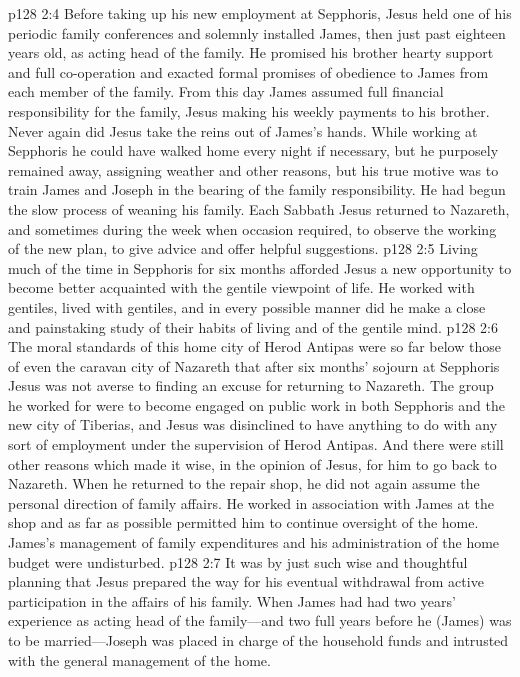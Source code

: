 \pc \vs p128 2:4 Before taking up his new employment at Sepphoris, Jesus held one of his periodic family conferences and solemnly installed James, then just past eighteen years old, as acting head of the family. He promised his brother hearty support and full co\hyp{}operation and exacted formal promises of obedience to James from each member of the family. From this day James assumed full financial responsibility for the family, Jesus making his weekly payments to his brother. Never again did Jesus take the reins out of James’s hands. While working at Sepphoris he could have walked home every night if necessary, but he purposely remained away, assigning weather and other reasons, but his true motive was to train James and Joseph in the bearing of the family responsibility. He had begun the slow process of weaning his family. Each Sabbath Jesus returned to Nazareth, and sometimes during the week when occasion required, to observe the working of the new plan, to give advice and offer helpful suggestions.
\pc \vs p128 2:5 Living much of the time in Sepphoris for six months afforded Jesus a new opportunity to become better acquainted with the gentile viewpoint of life. He worked with gentiles, lived with gentiles, and in every possible manner did he make a close and painstaking study of their habits of living and of the gentile mind.
\vs p128 2:6 The moral standards of this home city of Herod Antipas were so far below those of even the caravan city of Nazareth that after six months’ sojourn at Sepphoris Jesus was not averse to finding an excuse for returning to Nazareth. The group he worked for were to become engaged on public work in both Sepphoris and the new city of Tiberias, and Jesus was disinclined to have anything to do with any sort of employment under the supervision of Herod Antipas. And there were still other reasons which made it wise, in the opinion of Jesus, for him to go back to Nazareth. When he returned to the repair shop, he did not again assume the personal direction of family affairs. He worked in association with James at the shop and as far as possible permitted him to continue oversight of the home. James’s management of family expenditures and his administration of the home budget were undisturbed.
\vs p128 2:7 It was by just such wise and thoughtful planning that Jesus prepared the way for his eventual withdrawal from active participation in the affairs of his family. When James had had two years’ experience as acting head of the family---and two full years before he (James) was to be married---Joseph was placed in charge of the household funds and intrusted with the general management of the home.
